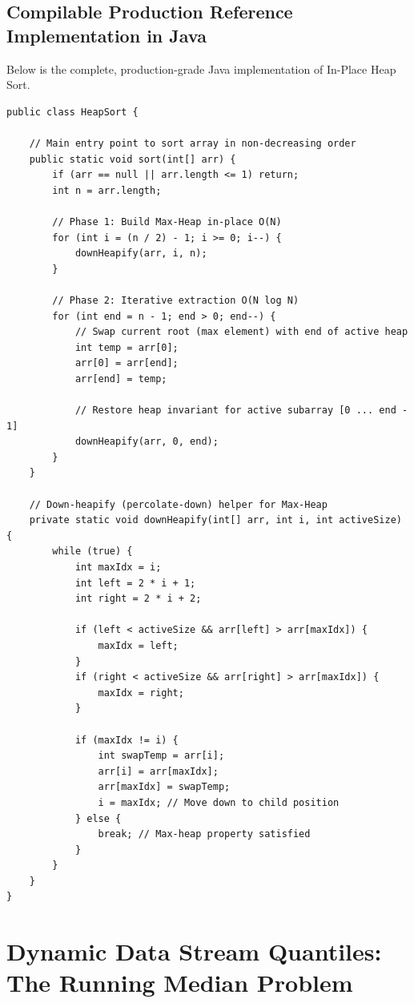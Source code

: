 \documentclass[10pt,journal,compsoc,onecolumn]{IEEEtran}
\begin{document}
\subsection{Compilable Production Reference Implementation in Java}

Below is the complete, production-grade Java implementation of In-Place Heap Sort.

\begin{verbatim}
public class HeapSort {

    // Main entry point to sort array in non-decreasing order
    public static void sort(int[] arr) {
        if (arr == null || arr.length <= 1) return;
        int n = arr.length;

        // Phase 1: Build Max-Heap in-place O(N)
        for (int i = (n / 2) - 1; i >= 0; i--) {
            downHeapify(arr, i, n);
        }

        // Phase 2: Iterative extraction O(N log N)
        for (int end = n - 1; end > 0; end--) {
            // Swap current root (max element) with end of active heap
            int temp = arr[0];
            arr[0] = arr[end];
            arr[end] = temp;

            // Restore heap invariant for active subarray [0 ... end - 1]
            downHeapify(arr, 0, end);
        }
    }

    // Down-heapify (percolate-down) helper for Max-Heap
    private static void downHeapify(int[] arr, int i, int activeSize) {
        while (true) {
            int maxIdx = i;
            int left = 2 * i + 1;
            int right = 2 * i + 2;

            if (left < activeSize && arr[left] > arr[maxIdx]) {
                maxIdx = left;
            }
            if (right < activeSize && arr[right] > arr[maxIdx]) {
                maxIdx = right;
            }

            if (maxIdx != i) {
                int swapTemp = arr[i];
                arr[i] = arr[maxIdx];
                arr[maxIdx] = swapTemp;
                i = maxIdx; // Move down to child position
            } else {
                break; // Max-heap property satisfied
            }
        }
    }
}
\end{verbatim}


\section{Dynamic Data Stream Quantiles: The Running Median Problem}
\label{sec:running-median}
\end{document}

